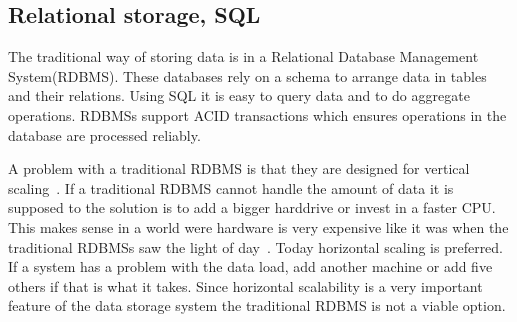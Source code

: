 \subsection{Relational storage, SQL}
\label{sec:sql}
The traditional way of storing data is in a Relational Database Management System(RDBMS).
These databases rely on a schema to arrange data in tables and their relations.
Using SQL it is easy to query data and to do aggregate operations.
RDBMSs support ACID transactions which ensures operations in the database are processed reliably.


A problem with a traditional RDBMS is that they are designed for vertical scaling~\cite{Atzeni:TheRelationalModelIsDead}. If a traditional RDBMS cannot handle the amount of data it is supposed to the solution is to add a bigger harddrive or invest in a faster CPU. This makes sense in a world were hardware is very expensive like it was when the traditional RDBMSs saw the light of day~\cite{Stonebraker:TheEndOfAnArchitecturalEra}. Today horizontal scaling is preferred. If a system has a problem with the data load, add another machine or add five others if that is what it takes. Since horizontal scalability is a very important feature of the data storage system the traditional RDBMS is not a viable option.

